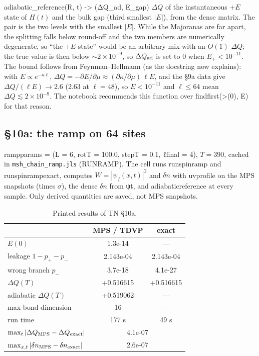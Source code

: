 \documentclass[11pt]{article}
\newcommand{\nb}[1]{\texttt{#1}}
\newcommand{\codeus}{\textunderscore\allowbreak}
\renewcommand{\code}[1]{{\ttfamily\let\_\codeus #1}}
\begin{document}
\begin{function}{adiabatic\_reference(R, t) -> (ΔQ\_ad, E\_gap)}
$\Delta Q$ of the instantaneous $+E$ state of $H(t)$ and the bulk gap (third smallest $|E|$), from the dense matrix. The pair is the two levels with the smallest $|E|$. While the Majoranas are far apart, the splitting falls below round-off and the two members are numerically degenerate, so ``the $+E$ state'' would be an arbitrary mix with an $O(1)$ $\Delta Q$; the true value is then below $\sim2\times10^{-9}$, so $\Delta Q_{\rm ad}$ is set to 0 when $E_+<10^{-11}$. The bound follows from
Feynman--Hellmann (as the docstring now explains): with $E\propto e^{-\kappa\ell}$, $\Delta Q=-\partial E/\partial\mu\approx(\partial\kappa/\partial\mu)\,\ell E$,
and the §9a data give $\Delta Q/(\ell E)\to2.6$ (2.63 at $\ell=48$), so $E<10^{-11}$ and $\ell\le64$ mean $\Delta Q\lesssim2\times10^{-9}$. The notebook recommends this function over \code{findfirst(>(0), E)} for that reason.
\end{function}

\subsection{§10a: the ramp on 64 sites}

\code{ramp\_params = (L = 6, rot\_T = 100.0, step\_T = 0.1, ℓ\_final = 4)}, $T=390$, cached in \nb{msh\_chain\_ramp.jls} (\code{RUN\_RAMP}). The cell runs \code{run\_spin\_ramp} and \code{run\_spin\_ramp\_exact}, computes $W=|\psi_f(x,t)|^2$ and $\delta n$ with \code{uv\_profile} on the MPS snapshots (times $\sigma$), the dense $\delta n$ from \code{ψ\_t}, and \code{adiabatic\_reference} at every sample. Only derived quantities are saved, not MPS snapshots.

\begin{table}[H]
\centering\small
\caption{Printed results of TN §10a.}
\begin{tabular}{lcc}
\toprule
 & MPS / TDVP & exact\\
\midrule
$E(0)$ & 1.3e-14 & —\\
leakage $1-p_+-p_-$ & 2.143e-04 & 2.143e-04\\
wrong branch $p_-$ & 3.7e-18 & 4.1e-27\\
$\Delta Q(T)$ & +0.516615 & +0.516615\\
adiabatic $\Delta Q(T)$ & +0.519062 & —\\
max bond dimension & 16 & —\\
run time & 177 s & 49 s\\
\midrule
$\max_t|\Delta Q_{\rm MPS}-\Delta Q_{\rm exact}|$ & \multicolumn{2}{c}{4.1e-07}\\
$\max_{x,t}|\delta n_{\rm MPS}-\delta n_{\rm exact}|$ & \multicolumn{2}{c}{2.6e-07}\\
\bottomrule
\end{tabular}
\end{table}
\end{document}
